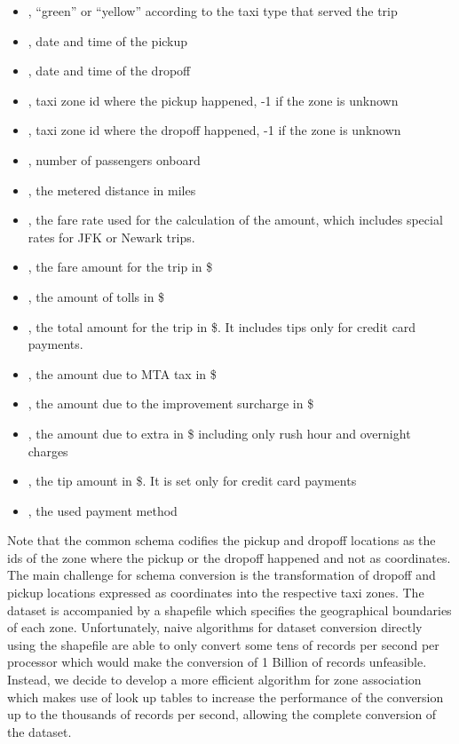 \documentclass{acm_proc_article-sp-sigmod09}
\begin{document}
\begin{itemize}
	\item {}, ``green'' or ``yellow'' according to the taxi type that served the trip
	\item {}, date and time of the pickup
	\item {}, date and time of the dropoff
	\item {}, taxi zone id where the pickup happened, -1 if the zone is unknown
	\item {}, taxi zone id where the dropoff happened, -1 if the zone is unknown
	\item {}, number of passengers onboard
	\item {}, the metered distance in miles
	\item {}, the fare rate used for the calculation of the amount, which includes special rates for JFK or Newark trips.
	\item {}, the fare amount for the trip in \$
	\item {}, the amount of tolls in \$
	\item {}, the total amount for the trip in \$. It includes tips only for credit card payments.
	\item {}, the amount due to MTA tax in \$
	\item {}, the amount due to the improvement surcharge in \$
	\item {}, the amount due to extra in \$ including only rush hour and overnight charges
	\item {}, the tip amount in \$. It is set only for credit card payments
	\item {}, the used payment method
\end{itemize}

Note that the common schema codifies the pickup and dropoff locations as the ids of the zone where the pickup or the dropoff happened and not as coordinates. The main challenge for schema conversion is the transformation of dropoff and pickup locations expressed as coordinates into the respective taxi zones. The dataset is accompanied by a shapefile which specifies the geographical boundaries of each zone. Unfortunately, naive algorithms for dataset conversion directly using the shapefile are able to only convert some tens of records per second per processor which would make the conversion of 1 Billion of records unfeasible. Instead, we decide to develop a more efficient algorithm for zone association which makes use of look up tables to increase the performance of the conversion up to the thousands of records per second, allowing the complete conversion of the dataset.
\end{document}
